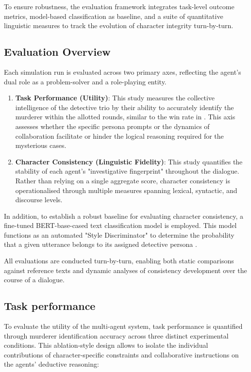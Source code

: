 \documentclass{article}
\begin{document}
To ensure robustness, the evaluation framework integrates task-level outcome metrics, model-based classification as baseline, and a suite of quantitative linguistic measures to track the evolution of character integrity turn-by-turn.

\subsection{Evaluation Overview}

Each simulation run is evaluated across two primary axes, reflecting the agent's dual role as a problem-solver and a role-playing entity.

\begin{enumerate}
    \item \textbf{Task Performance (Utility)}: This study measures the collective intelligence of the detective trio by their ability to accurately identify the murderer within the allotted rounds, similar to the win rate in \cite{zhu2024player}. This axis assesses whether the specific persona prompts or the dynamics of collaboration facilitate or hinder the logical reasoning required for the mysterious cases.
    \item \textbf{Character Consistency (Linguistic Fidelity)}: This study quantifies the stability of each agent's "investigative fingerprint" throughout the dialogue. Rather than relying on a single aggregate score, character consistency is operationalised through multiple measures spanning lexical, syntactic, and discourse levels.
\end{enumerate}

In addition, to establish a robust baseline for evaluating character consistency, a fine-tuned BERT-base-cased text classification model is employed. This model functions as an automated "Style Discriminator" to determine the probability that a given utterance belongs to its assigned detective persona \citep{wang2024character100}.

All evaluations are conducted turn-by-turn, enabling both static comparisons against reference texts and dynamic analyses of consistency development over the course of a dialogue.

\subsection{Task performance}

To evaluate the utility of the multi-agent system, task performance is quantified through murderer identification accuracy across three distinct experimental conditions. This ablation-style design allows to isolate the individual contributions of character-specific constraints and collaborative instructions on the agents’ deductive reasoning:
\end{document}
